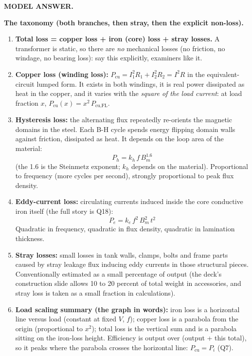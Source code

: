 \documentclass[11pt]{article}
\newcommand{\tagline}[1]{\textbf{\color{copper}#1}}
\begin{document}
\tagline{MODEL ANSWER.}

\textbf{The taxonomy (both branches, then stray, then the explicit non-loss).}
\begin{enumerate}[label=\arabic*.]
\item \textbf{Total loss = copper loss + iron (core) loss + stray losses.} A transformer is static, so there are \emph{no} mechanical losses (no friction, no windage, no bearing loss): say this explicitly, examiners like it.
\item \textbf{Copper loss (winding loss):} $P_{\text{cu}} = I_1^{2} R_1 + I_2^{2} R_2 = I^{2} R$ in the equivalent-circuit lumped form. It exists in both windings, it is real power dissipated as heat in the copper, and it varies with the \emph{square of the load current}: at load fraction $x$, $P_{\text{cu}}(x) = x^{2}\, P_{\text{cu,FL}}$.
\item \textbf{Hysteresis loss:} the alternating flux repeatedly re-orients the magnetic domains in the steel. Each B-H cycle spends energy flipping domain walls against friction, dissipated as heat. It depends on the loop area of the material:
\[
P_h = k_h\, f\, B_m^{1.6}
\]
(the 1.6 is the Steinmetz exponent; $k_h$ depends on the material). Proportional to frequency (more cycles per second), strongly proportional to peak flux density.
\item \textbf{Eddy-current loss:} circulating currents induced inside the core conductive iron itself (the full story is Q18):
\[
P_e = k_e\, f^{2}\, B_m^{2}\, t^{2}
\]
Quadratic in frequency, quadratic in flux density, quadratic in lamination thickness.
\item \textbf{Stray losses:} small losses in tank walls, clamps, bolts and frame parts caused by stray leakage flux inducing eddy currents in those structural pieces. Conventionally estimated as a small percentage of output (the deck's construction slide allows 10 to 20 percent of total weight in accessories, and stray loss is taken as a small fraction in calculations).
\item \textbf{Load scaling summary (the graph in words):} iron loss is a horizontal line versus load (constant at fixed $V$, $f$); copper loss is a parabola from the origin (proportional to $x^{2}$); total loss is the vertical sum and is a parabola sitting on the iron-loss height. Efficiency is output over (output + this total), so it peaks where the parabola crosses the horizontal line: $P_{\text{cu}} = P_i$ (Q7).
\end{enumerate}
\end{document}
